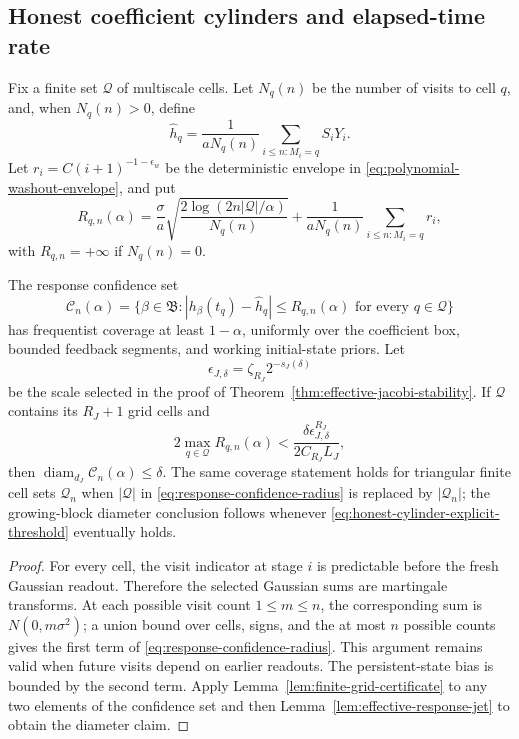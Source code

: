 \subsection{Honest coefficient cylinders and elapsed-time rate}

Fix a finite set \(\mathcal Q\) of multiscale cells.  Let \(N_q(n)\) be the
number of visits to cell \(q\), and, when \(N_q(n)>0\), define
\[
 \widehat h_q=\frac1{aN_q(n)}
   \sum_{i\le n:M_i=q}S_iY_i.
\]
Let \(r_i=C(i+1)^{-1-\epsilon_w}\) be the deterministic envelope in
\eqref{eq:polynomial-washout-envelope}, and put
\begin{equation}
 R_{q,n}(\alpha)=
 \frac{\sigma}{a}\sqrt{\frac{2\log(2n|\mathcal Q|/\alpha)}{N_q(n)}}
 +\frac1{aN_q(n)}\sum_{i\le n:M_i=q}r_i,
 \label{eq:response-confidence-radius}
\end{equation}
with \(R_{q,n}=+\infty\) if \(N_q(n)=0\).

\begin{theorem}
\label{thm:honest-jacobi-cylinders}
The response confidence set
\begin{equation}
 \mathcal C_n(\alpha)=\{\beta\in\mathfrak B:
 |h_\beta(t_q)-\widehat h_q|\le R_{q,n}(\alpha)
 \text{ for every }q\in\mathcal Q\}
 \label{eq:response-confidence-set}
\end{equation}
has frequentist coverage at least \(1-\alpha\), uniformly over the coefficient
box, bounded feedback segments, and working initial-state priors.  Let
\[
 \epsilon_{J,\delta}=\zeta_{R_J}2^{-s_J(\delta)}
\]
be the scale selected in the proof of
Theorem~\ref{thm:effective-jacobi-stability}.  If \(\mathcal Q\) contains its
\(R_J+1\) grid cells and
\begin{equation}
 2\max_{q\in\mathcal Q}R_{q,n}(\alpha)
 <\frac{\delta\epsilon_{J,\delta}^{R_J}}
        {2C_{R_J}L_J},
 \label{eq:honest-cylinder-explicit-threshold}
\end{equation}
then \(\operatorname{diam}_{d_J}\mathcal C_n(\alpha)\le\delta\).  The same
coverage statement holds for triangular finite cell sets \(\mathcal Q_n\)
when \(|\mathcal Q|\) in \eqref{eq:response-confidence-radius} is replaced by
\(|\mathcal Q_n|\); the growing-block diameter conclusion follows whenever
\eqref{eq:honest-cylinder-explicit-threshold} eventually holds.
\end{theorem}

\begin{proof}
For every cell, the visit indicator at stage \(i\) is predictable before the
fresh Gaussian readout.  Therefore the selected Gaussian sums are martingale
transforms.  At each possible visit count \(1\le m\le n\), the corresponding
sum is \(N(0,m\sigma^2)\); a union bound over cells, signs, and the at most
\(n\) possible counts gives the first term of
\eqref{eq:response-confidence-radius}.  This argument remains valid when
future visits depend on earlier readouts.  The persistent-state bias is
bounded by the second term.  Apply
Lemma~\ref{lem:finite-grid-certificate} to any two elements of the confidence
set and then Lemma~\ref{lem:effective-response-jet} to obtain the diameter
claim.
\end{proof}

